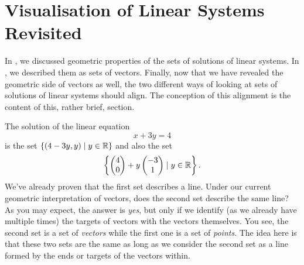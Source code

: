 \section{Visualisation of Linear Systems Revisited}
\label{sec:visualisation-of-linear-systems-revisited}

In , we discussed geometric
properties of the sets of solutions of linear systems. In
, we described
them as sets of vectors. Finally, now that we have revealed the geometric side
of vectors as well, the two different ways of looking at sets of solutions of
linear systems should align. The conception of this alignment is the content of
this, rather brief, section.

The solution of the linear equation
\[
 x + 3y = 4
\]
is the set $\{(4-3y,y) \mid y \in \mathbb{R}\}$ and also the set
\[
 \left\{ 
  \begin{pmatrix}
   4\\
   0
  \end{pmatrix}
  + y 
  \begin{pmatrix}
   -3\\
   1
  \end{pmatrix} \mid y \in \mathbb{R}
 \right\}.
\]
We've already proven that the first set describes a line. Under our current
geometric interpretation of vectors, does the second set describe the same line?
As you may expect, the answer is \emph{yes}, but only if we identify (as we
already have multiple times) the targets of vectors with the vectors themselves.
You see, the second set is a set of \emph{vectors} while the first one is a set
of \emph{points}. The idea here is that these two sets are the same as long as
we consider the second set as a line formed by the ends or targets of the
vectors within.

